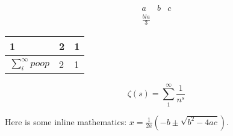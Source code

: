\begin{align*}
a & b & c \\
\frac{bla}{3} & & 
\end{align*}

\begin{tabular}{|l|l|l|}\hline
1 & 2 & 1 \\ \hline
$\sum_i^\infty poop$ & 2 & 1 \hline
\end{tabular}

$$\zeta(s) = \sum_1^\infty \frac{1}{n^s}$$

Here is some inline mathematics: $x = \tfrac{1}{2a}(-b \pm \sqrt{b^2 - 4ac})$.
